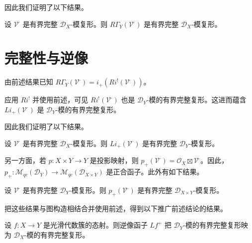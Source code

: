 因此我们证明了以下结果。

\begin{lemma}\label{lem:5.5.1}
设 $\mathcal{V}^\cdot$ 是有界完整 $\mathcal{D}_X$-模复形。则 $R\Gamma_Y(\mathcal{V}^\cdot)$ 是有界完整 $\mathcal{D}_X$-模复形。
\end{lemma}

\section{完整性与逆像}

由前述结果已知 $R\Gamma_Y(\mathcal{V}^\cdot)=i_+(Ri^!(\mathcal{V}^\cdot))$。

应用 $Ri^!$ 并使用前述，可见 $Ri^!(\mathcal{V}^\cdot)$ 也是 $\mathcal{D}_Y$-模的有界完整复形。这进而蕴含 $Li_+(\mathcal{V}^\cdot)$ 是 $\mathcal{D}_Y$-模的有界完整复形。

因此我们证明了以下结果。

\begin{lemma}\label{lem:5.6.1}
设 $\mathcal{V}^\cdot$ 是有界完整 $\mathcal{D}_X$-模复形。则 $Li_+(\mathcal{V}^\cdot)$ 是有界完整 $\mathcal{D}_Y$-模复形。
\end{lemma}

另一方面，若 $p:X\times Y\to Y$ 是投影映射，则 $p_+(\mathcal{V}^\cdot)=\mathcal{O}_X\boxtimes\mathcal{V}^\cdot$。因此，$p_+:\mathcal{M}_{qc}(\mathcal{D}_Y)\to\mathcal{M}_{qc}(\mathcal{D}_{X\times Y})$ 是正合函子。此外有如下结果。

\begin{lemma}\label{lem:5.6.2}
设 $\mathcal{V}^\cdot$ 是有界完整 $\mathcal{D}_Y$-模复形。则 $p_+(\mathcal{V}^\cdot)$ 是有界完整 $\mathcal{D}_{X\times Y}$-模复形。
\end{lemma}

把这些结果与图构造相结合并使用前述，得到以下推广前述结论的结果。

\begin{theorem}\label{thm:5.6.3}
设 $f:X\to Y$ 是光滑代数簇的态射。则逆像函子 $Lf^+$ 把 $\mathcal{D}_Y$-模的有界完整复形映为 $\mathcal{D}_X$-模的有界完整复形。
\end{theorem}
